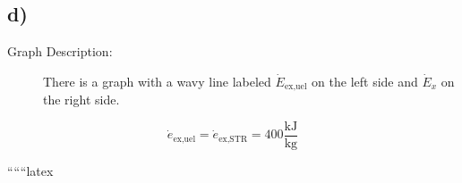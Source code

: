 

\subsection*{d)}

\begin{description}
    \item[Graph Description:] There is a graph with a wavy line labeled \( \dot{E}_{\text{ex,uel}} \) on the left side and \( \dot{E}_{x} \) on the right side.
\end{description}

\[
\dot{e}_{\text{ex,uel}} = \dot{e}_{\text{ex,STR}} = 400 \frac{\text{kJ}}{\text{kg}}
\]

``````latex